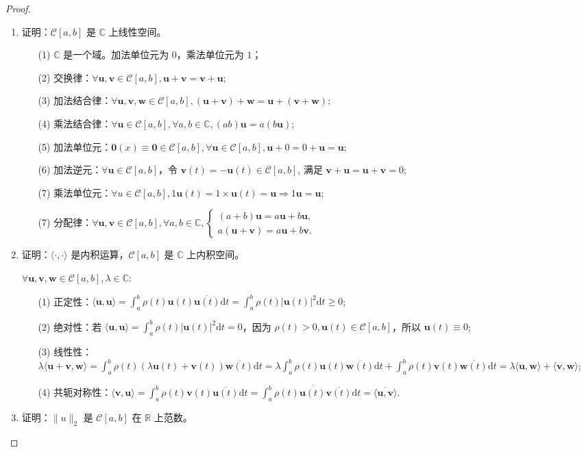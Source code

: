 \documentclass[lang=cn,a4paper,newtx,bibend=bibtex]{elegantpaper}
\newcommand{\uB}{\bm{u}}
\newcommand{\vB}{\bm{v}}
\newcommand{\wB}{\bm{w}}
\newcommand{\dd}{\mathrm{d}}
\newcommand{\CBB}{\mathbb{C}}
\newcommand{\CM}{\mathcal{C}}
\begin{document}
\begin{proof}~~

\begin{enumerate}
\item 证明：$\mathcal{C}[a, b]$ 是 $\mathbb{C}$ 上线性空间。
\begin{enumerate}
  \item[(1)] $\mathbb{C}$ 是一个域。加法单位元为 $0$，乘法单位元为 $1$；
  \item[(2)] 交换律：$\forall \uB, \vB \in \CM[a, b], \uB + \vB = \vB + \uB$;
  \item[(3)] 加法结合律：$\forall \uB, \vB, \wB \in \CM[a, b], (\uB + \vB) + \wB = \uB + (\vB + \wB)$;
  \item[(4)] 乘法结合律：$\forall \uB \in \CM[a, b], \forall a, b \in \CBB, (ab)\uB = a(b\uB)$;
  \item[(5)] 加法单位元：$\bm{0}(x) \equiv \bm{0} \in \CM[a, b], \forall \uB \in \CM[a, b], \uB + 0 = 0 + \uB = \uB$;
  \item[(6)] 加法逆元：$\forall \uB \in \CM[a, b]$，令 $\vB(t) = -\uB(t) \in \CM[a, b]$, 满足 $\vB + \uB = \uB + \vB = 0$;
  \item[(7)] 乘法单位元：$\forall u \in \CM[a, b], 1\uB(t) = 1\times\uB(t) = \uB \Rightarrow 1\uB = \uB$;
  \item[(7)] 分配律：$\forall \uB, \vB \in \CM[a, b], \forall a, b\in \CBB, \begin{cases} (a+b)\uB = a\uB + b\uB, \\ a(\uB + \vB) = a\uB + b\vB.\end{cases}$  
\end{enumerate}
\item 证明：$\langle \cdot, \cdot \rangle$ 是内积运算，$\mathcal{C}[a, b]$ 是 $\mathbb{C}$ 上内积空间。

$\forall \uB, \vB, \wB \in \CM[a, b], \lambda \in \CBB$:
\begin{enumerate}
  \item[(1)] 正定性：$\langle \uB, \uB \rangle = \int_a^b \rho(t)\uB(t)\overline{\uB(t)}\dd t = \int_a^b \rho(t)|\uB(t)|^2 \dd t \ge 0$;
  \item[(2)] 绝对性：若 $\langle \uB, \uB \rangle = \int_a^b \rho(t)|\uB(t)|^2 \dd t = 0$，因为 $\rho(t) > 0, \uB(t) \in \CM[a, b]$，所以 $\uB(t) \equiv 0$;
  \item[(3)] 线性性：$\lambda \langle \uB + \vB, \wB \rangle = \int_a^b \rho(t)(\lambda \uB(t) + \vB(t))\overline{\wB(t)} \dd t = \lambda \int_a^b \rho(t)\uB(t)\overline{\wB(t)}\dd t + \int_a^b \rho(t)\vB(t)\overline{\wB(t)} \dd t = \lambda \langle \uB, \wB\rangle + \langle \vB, \wB \rangle$;
  \item[(4)] 共轭对称性：$\langle \vB, \uB \rangle = \int_a^b \rho(t)\vB(t)\overline{\uB(t)}\dd t = \int_a^b \overline{\rho(t)\uB(t)\overline{\vB(t)}}\dd t = \overline{\langle \uB, \vB\rangle}$. 
\end{enumerate}
\item 证明：$\| u \|_2$ 是 $\mathcal{C}[a, b]$ 在 $\mathbb{R}$ 上范数。


\end{enumerate}
\end{proof}
\end{document}
